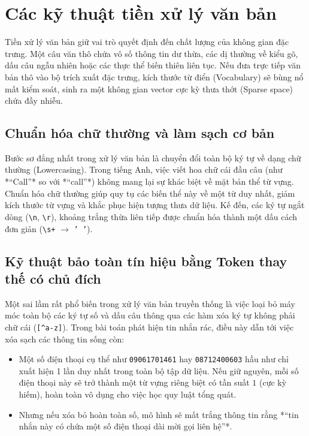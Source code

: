 \section{Các kỹ thuật tiền xử lý văn bản}
\label{sec:tien-xu-ly-ly-thuyet}

Tiền xử lý văn bản giữ vai trò quyết định đến chất lượng của không gian đặc trưng. Một câu văn thô chứa vô số thông tin dư thừa, các dị thường về kiểu gõ, dấu câu ngẫu nhiên hoặc các thực thể biến thiên liên tục. Nếu đưa trực tiếp văn bản thô vào bộ trích xuất đặc trưng, kích thước từ điển (Vocabulary) sẽ bùng nổ mất kiểm soát, sinh ra một không gian vector cực kỳ thưa thớt (Sparse space) chứa đầy nhiễu.

\subsection{Chuẩn hóa chữ thường và làm sạch cơ bản}
Bước sơ đẳng nhất trong xử lý văn bản là chuyển đổi toàn bộ ký tự về dạng chữ thường (Lowercasing). Trong tiếng Anh, việc viết hoa chữ cái đầu câu (như *“Call”* so với *“call”*) không mang lại sự khác biệt về mặt bản thể từ vựng. Chuẩn hóa chữ thường giúp quy tụ các biến thể này về một từ duy nhất, giảm kích thước từ vựng và khắc phục hiện tượng thưa dữ liệu. Kế đến, các ký tự ngắt dòng (\texttt{\textbackslash{}n}, \texttt{\textbackslash{}r}), khoảng trắng thừa liên tiếp được chuẩn hóa thành một dấu cách đơn giản (\texttt{\textbackslash{}s+} $\rightarrow$ \texttt{' '}).

\subsection{Kỹ thuật bảo toàn tín hiệu bằng Token thay thế có chủ đích}
Một sai lầm rất phổ biến trong xử lý văn bản truyền thống là việc loại bỏ máy móc toàn bộ các ký tự số và dấu câu thông qua các hàm xóa ký tự không phải chữ cái (\texttt{[\textasciicircum{}a-z]}). Trong bài toán phát hiện tin nhắn rác, điều này dẫn tới việc xóa sạch các thông tin sống còn:
\begin{itemize}
    \item Một số điện thoại cụ thể như \texttt{09061701461} hay \texttt{08712400603} hầu như chỉ xuất hiện 1 lần duy nhất trong toàn bộ tập dữ liệu. Nếu giữ nguyên, mỗi số điện thoại này sẽ trở thành một từ vựng riêng biệt có tần suất $1$ (cực kỳ hiếm), hoàn toàn vô dụng cho việc học quy luật tổng quát.
    \item Nhưng nếu xóa bỏ hoàn toàn số, mô hình sẽ mất trắng thông tin rằng *“tin nhắn này có chứa một số điện thoại dài mời gọi liên hệ”*.
\end{itemize}

